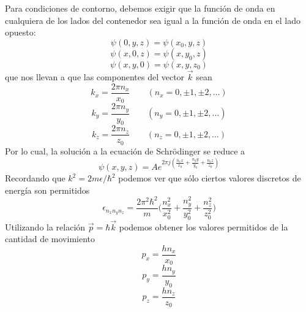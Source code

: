 \documentclass[12pt,a4paper]{article}
\def\e{{\epsilon}} %
\begin{document}
Para condiciones de contorno, debemos exigir que la función de onda en cualquiera de los lados del contenedor sea igual a la función de onda en el lado opuesto: %
\[ \psi (0,y,z) = \psi (x_{0},y,z) \]
\[ \psi (x,0,z) = \psi (x,y_{0},z) \]
\[ \psi (x,y,0) = \psi (x,y,z_{0}) \]
que nos llevan a que las componentes del vector $\vec{k}$ sean
\[ k_{x}=\frac{2\pi n_{x}}{x_{0}} \qquad (n_{x}=0, \pm 1, \pm 2, \ldots) \]
\[ k_{y}=\frac{2\pi n_{y}}{y_{0}} \qquad (n_{y}=0, \pm 1, \pm 2, \ldots) \]
\[ k_{z}=\frac{2\pi n_{z}}{z_{0}} \qquad (n_{z}=0, \pm 1, \pm 2, \ldots) \]
Por lo cual, la solución a la ecuación de Schrödinger se reduce a
\[ \psi (x,y,z)=Ae^{2 \pi j (\frac{n_{x}x}{x_{0}}+\frac{n_{y}y}{y_{0}}+\frac{n_{z}z}{z_{0}})} \]
Recordando que $k^{2}=2m\e/\hbar^{2}$ podemos ver que sólo ciertos valores discretos de energía son permitidos
\[ \e_{n_{x}n_{y}n_{z}}=\frac{2 \pi ^{2} \hbar^{2}}{m} \bigg( \frac{n_{x}^{2}}{x_{0}^{2}} + \frac{n_{y}^{2}}{y_{0}^{2}} + \frac{n_{z}^{2}}{z_{0}^{2}} \bigg) \]
Utilizando la relación $\vec{p}=\hbar \vec{k}$ podemos obtener los valores permitidos de la cantidad de movimiento
\[ p_{x}=\frac{hn_{x}}{x_{0}} \]
\[ p_{y}=\frac{hn_{y}}{y_{0}} \]
\[ p_{z}=\frac{hn_{z}}{z_{0}} \]
\end{document}

